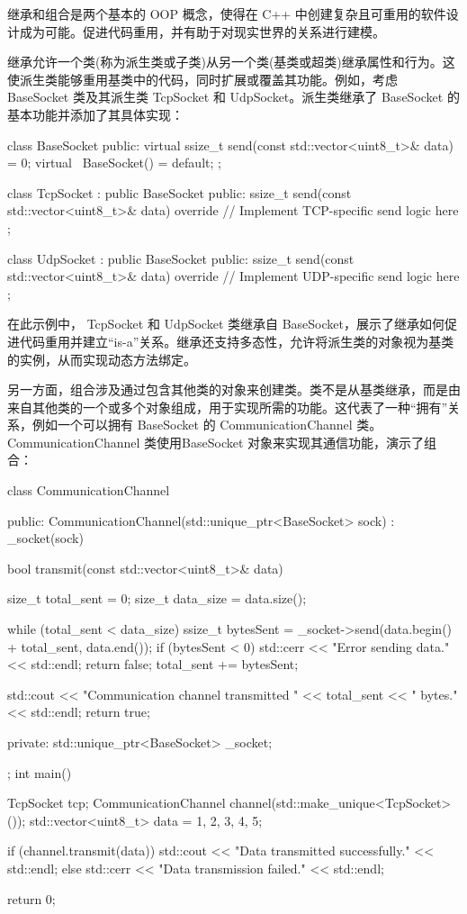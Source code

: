 
继承和组合是两个基本的 OOP 概念，使得在 C++ 中创建复杂且可重用的软件设计成为可能。促进代码重用，并有助于对现实世界的关系进行建模。

继承允许一个类(称为派生类或子类)从另一个类(基类或超类)继承属性和行为。这使派生类能够重用基类中的代码，同时扩展或覆盖其功能。例如，考虑 BaseSocket 类及其派生类 TcpSocket 和 UdpSocket。派生类继承了 BaseSocket 的基本功能并添加了其具体实现：

\begin{cpp}
class BaseSocket {
public:
    virtual ssize_t send(const std::vector<uint8_t>& data) = 0;
    virtual ~BaseSocket() = default;
};

class TcpSocket : public BaseSocket {
public:
    ssize_t send(const std::vector<uint8_t>& data) override {
        // Implement TCP-specific send logic here
    }
};

class UdpSocket : public BaseSocket {
public:
    ssize_t send(const std::vector<uint8_t>& data) override {
        // Implement UDP-specific send logic here
    }
};
\end{cpp}

在此示例中， TcpSocket 和 UdpSocket 类继承自 BaseSocket，展示了继承如何促进代码重用并建立“is-a”关系。继承还支持多态性，允许将派生类的对象视为基类的实例，从而实现动态方法绑定。

另一方面，组合涉及通过包含其他类的对象来创建类。类不是从基类继承，而是由来自其他类的一个或多个对象组成，用于实现所需的功能。这代表了一种“拥有”关系，例如一个可以拥有 BaseSocket 的 CommunicationChannel 类。 CommunicationChannel 类使用BaseSocket 对象来实现其通信功能，演示了组合：

\begin{cpp}
class CommunicationChannel {
    public:
    CommunicationChannel(std::unique_ptr<BaseSocket> sock) : _socket(sock) {}

    bool transmit(const std::vector<uint8_t>& data) {
        size_t total_sent = 0;
        size_t data_size = data.size();

        while (total_sent < data_size) {
            ssize_t bytesSent = _socket->send({data.begin() + total_sent, data.end()});
            if (bytesSent < 0) {
                std::cerr << "Error sending data." << std::endl;
                return false;
            }
            total_sent += bytesSent;
        }

        std::cout << "Communication channel transmitted " << total_sent << " bytes." << std::endl;
        return true;
    }
private:
    std::unique_ptr<BaseSocket> _socket;
};
int main() {
    TcpSocket tcp;
    CommunicationChannel channel(std::make_unique<TcpSocket>());
    std::vector<uint8_t> data = {1, 2, 3, 4, 5};

    if (channel.transmit(data)) {
        std::cout << "Data transmitted successfully." << std::endl;
    } else {
        std::cerr << "Data transmission failed." << std::endl;
    }

    return 0;
}
\end{cpp}

